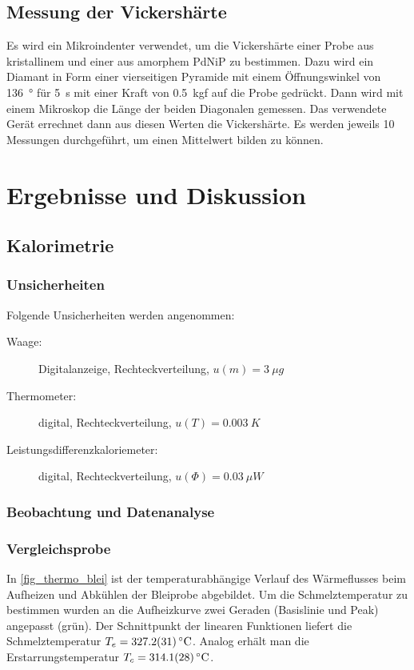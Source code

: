 \documentclass[
	a4paper,
	12pt,
	pagesize,
	ngerman
]{scrartcl}
\begin{document}
	\subsection{Messung der Vickershärte}
 	Es wird ein Mikroindenter verwendet, um die Vickershärte einer Probe aus kristallinem und einer aus amorphem PdNiP zu bestimmen. %
	Dazu wird ein Diamant in Form einer vierseitigen Pyramide mit einem Öffnungswinkel von \SI{136}{\degree} für \SI{5}{s} mit einer Kraft von \SI{0.5}{kgf} auf die Probe gedrückt.
	Dann wird mit einem Mikroskop die Länge der beiden Diagonalen gemessen.
	Das verwendete Gerät errechnet dann aus diesen Werten die Vickershärte.
	Es werden jeweils \num{10} Messungen durchgeführt, um einen Mittelwert bilden zu können.

	\section{Ergebnisse und Diskussion}

	\subsection{Kalorimetrie}
	\subsubsection{Unsicherheiten}
	Folgende Unsicherheiten werden angenommen:
	\begin{description}
		\item[Waage:]  Digitalanzeige, Rechteckverteilung, $u(m)=\SI{3}{\mu g}$
		\item[Thermometer:] digital, Rechteckverteilung, $u(T)=\SI{0.003}{K}$ %
		\item[Leistungsdifferenzkaloriemeter:] digital, Rechteckverteilung, $u(\Phi)=\SI{0.03}{\mu W}$ %
	\end{description}
	\subsubsection{Beobachtung und Datenanalyse}
	\subsubsection*{Vergleichsprobe} \label{ssss_vergleich}
	In \cref{fig_thermo_blei} ist der temperaturabhängige Verlauf des Wärmeflusses beim Aufheizen und Abkühlen  der Bleiprobe abgebildet.
	Um die Schmelztemperatur zu bestimmen wurden an die Aufheizkurve zwei Geraden (Basislinie und Peak) angepasst (grün).
	Der Schnittpunkt der linearen Funktionen liefert die Schmelztemperatur $T_e= \SI{327.2+-3.1}{\celsius}$.
	Analog erhält man die Erstarrungstemperatur $T_c = \SI{314.1+-2.8}{\celsius}$.
\end{document}
